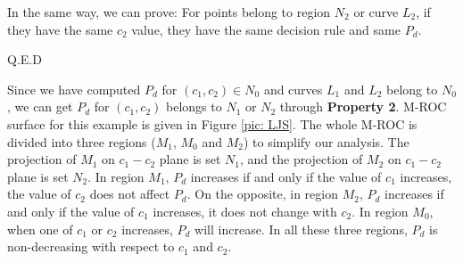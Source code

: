 In the same way, we can prove: For points belong to region $N_2$ or curve $L_2$, if they have the same $c_2$ value, they have the same decision rule and same $P_d$.

Q.E.D

Since we have computed $P_d$ for $(c_1, c_2) \in N_0$ and curves $L_1$ and $L_2$ belong to $N_0$, we can get $P_d$ for $(c_1, c_2)$ belongs to $N_1$ or $N_2$ through \textbf{Property 2}. M-ROC surface for this example is given in Figure  \ref{pic: LJS}.
The whole M-ROC is divided into three regions ($M_1$, $M_0$ and $M_2$) to simplify our analysis.  
 The projection of $M_1$ on $c_1-c_2$ plane is set $N_1$, and the projection of $M_2$ on $c_1-c_2$ plane is set $N_2$. 
In region $M_1$, $P_d$ increases if and only if the value of $c_1$ increases, the value of $c_2$ does not affect $P_d$. On the opposite, in region $M_2$, $P_d$ increases if and only if the value of $c_1$ increases, it does not change with $c_2$. In region $M_0$, when one of $c_1$ or $c_2$ increases, $P_d$ will increase. In all these three regions, $P_d$ is non-decreasing with respect to $c_1$ and $c_2$. 

